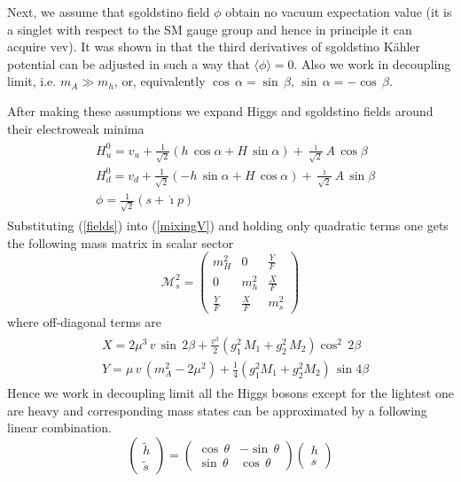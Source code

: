 \documentclass[10pt]{article}
\begin{document}
\noindent
Next, we assume that sgoldstino field $\phi$ obtain no vacuum expectation value (it is a singlet with respect to the SM gauge group and hence in principle it can acquire vev). It was shown in \cite{DemAst} that the third derivatives of sgoldstino K{\"a}hler potential can be adjusted in such a way that $\langle \phi \rangle = 0$. Also we work in decoupling limit, i.e. $m_A \gg m_h$, or, equivalently $\cos \, \alpha = \sin \, \beta, \, \sin \, \alpha = - \cos \, \beta$. 

\noindent
After making these assumptions we expand Higgs and sgoldstino fields around their electroweak minima
\begin{eqnarray}
\label{fields}
\begin{aligned}
& H_{u}^{0} = v_{u} + \frac{1}{\sqrt{2}} \left(h \, \cos \alpha + H \, \sin \alpha \right) + \frac{\dot{\imath}}{\sqrt{2}} A \, \cos \beta \\ 
& H_{d}^{0} = v_{d} + \frac{1}{\sqrt{2}} \left(-h \, \sin \alpha + H \, \cos \alpha \right) + \frac{\dot{\imath}}{\sqrt{2}} A \, \sin \beta \\ 
& \phi = \frac{1}{\sqrt{2}} \left(s + \dot{\imath} p \right)
\end{aligned}
\end{eqnarray}
Substituting (\ref{fields}) into (\ref{mixingV}) and holding only quadratic terms one gets the following mass matrix in scalar sector
\begin{equation}
\label{massmatrix}
\mathcal{M}_s^2 = 
\left(\begin{matrix}
m_H^2 & 0 & \frac{Y}{F} \\ 0 & m_h^2 & \frac{X}{F} \\ 
\frac{Y}{F} & \frac{X}{F} & m_s^2 
\end{matrix} \right)
\end{equation}
where off-diagonal terms are
\begin{eqnarray}
\begin{aligned}
& X = 2 \mu^3 \, v \, \sin \, 2 \beta + \frac{v^3}{2} (g_1^2 \, M_1 + g_2^2 \, M_2) \cos^2 \, 2\beta \\
& Y = \mu \, v \, (m_A^2-2\mu^2) + \frac{1}{4} \left(g_1^2 M_1 + g_2^2 M_2\right) \, \sin 4\beta
\end{aligned}
\end{eqnarray}
Hence we work in decoupling limit all the Higgs bosons except for the lightest one are heavy and corresponding mass states can be approximated by a following linear combination.
\begin{equation}
\label{mixing1}
\left( \begin{matrix}
\tilde{h} \\ \tilde{s}
\end{matrix} \right) = 
\left( \begin{matrix}
\cos \, \theta & -\sin \, \theta \\
\sin \, \theta & \cos \, \theta
\end{matrix} \right) 
\left( \begin{matrix}
h \\ s
\end{matrix} \right)
\end{equation} 
\end{document}
